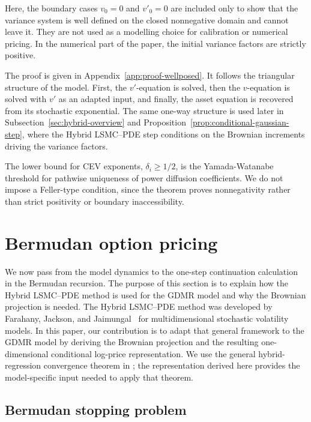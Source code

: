 \documentclass[pdflatex,sn-mathphys-num]{sn-jnl}
\theoremstyle{thmstyleone}%
\theoremstyle{thmstylethree}%
\theoremstyle{thmstyletwo}%
\begin{document}
Here, the boundary cases $v_0=0$ and $v'_0=0$ are included only to show that the variance system is well defined on the closed nonnegative domain and cannot leave it. They are not used as a modelling choice for calibration or numerical pricing. In the numerical part of the paper, the initial variance factors are strictly positive.

The proof is given in Appendix~\ref{app:proof-wellposed}. It follows the triangular structure of the model.
First, the $v'$-equation is solved, then the $v$-equation is solved with $v'$ as
an adapted input, and finally, the asset equation is recovered from its
stochastic exponential. The same one-way structure is used later in
Subsection~\ref{sec:hybrid-overview} and Proposition~\ref{prop:conditional-gaussian-step}, where the Hybrid LSMC--PDE step conditions on the Brownian increments driving the variance factors.

The lower bound for CEV exponents, $\delta_i\ge1/2$,  is the Yamada-Watanabe threshold for
pathwise uniqueness of power diffusion coefficients. We do not impose a
Feller-type condition, since the theorem proves nonnegativity rather than strict
positivity or boundary inaccessibility.

\section{Bermudan option pricing}\label{sec:conditional_pde}

We now pass from the model dynamics to the one-step continuation calculation in
the Bermudan recursion. The purpose of this section is to explain how the Hybrid LSMC--PDE method is used for the GDMR model and why the Brownian projection is needed.
The Hybrid LSMC--PDE method was developed by Farahany, Jackson, and Jaimungal~\cite{farahany2020mixing} for multidimensional stochastic volatility models. In this paper, our contribution is to adapt that general framework to the GDMR model by deriving the Brownian projection and the resulting one-dimensional conditional log-price representation. We use the
general hybrid-regression convergence theorem in \cite{farahany2020mixing}; the representation derived here provides the
model-specific input needed to apply that theorem.

\subsection{Bermudan stopping problem}\label{sec:bermudan-recursion}
\end{document}

